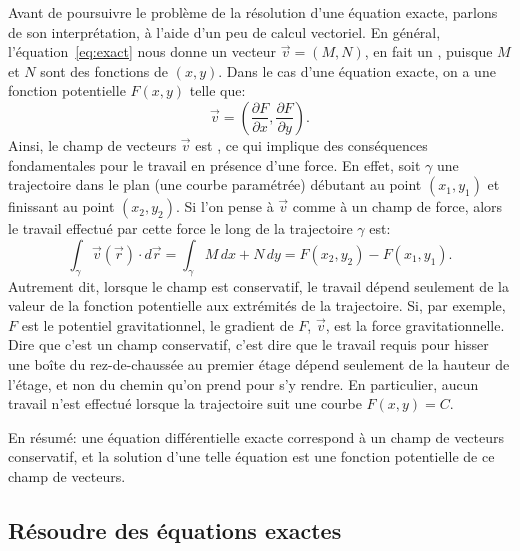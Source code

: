 Avant de poursuivre le problème de la résolution d'une équation exacte, parlons de son interprétation, à l'aide d'un peu de calcul vectoriel.
En général, l'équation~\eqref{eq:exact} nous donne un vecteur $\vec{v} = (M,N)$, en fait un \emph{},
puisque $M$ et $N$ sont des fonctions de $(x,y)$.
Dans le cas d'une équation exacte, on a une fonction potentielle $F(x,y)$ telle que:
\begin{equation*}
	\vec{v} = \left( \frac{\partial F}{\partial x} ,\frac{\partial F}{\partial y} \right) .
\end{equation*}
Ainsi, le champ de vecteurs $\vec{v}$ est \emph{},
ce qui implique des conséquences fondamentales pour le travail en présence d'une force.
En effet, soit $\gamma$ une trajectoire dans le plan (une courbe paramétrée) débutant au point $(x_1,y_1)$
et finissant au point $(x_2,y_2)$.
Si l'on pense à $\vec{v}$ comme à un champ de force, alors le travail effectué par cette force
le long de la trajectoire $\gamma$ est:
\begin{equation*}
	\int_\gamma \vec{v}(\vec{r}) \cdot d\vec{r}
	= \int_\gamma M \, dx + N \, dy
	= F(x_2,y_2) - F(x_1,y_1) .
\end{equation*}
Autrement dit, lorsque le champ est conservatif, le travail dépend seulement de la valeur de la fonction potentielle aux extrémités de la trajectoire.
Si, par exemple, $F$ est le potentiel gravitationnel, le gradient de $F$, $\vec{v}$, est la force gravitationnelle.
Dire que c'est un champ conservatif, c'est dire que le travail requis pour hisser une boîte du rez-de-chaussée au premier étage
dépend seulement de la hauteur de l'étage, et non du chemin qu'on prend pour s'y rendre.
En particulier, aucun travail n'est effectué lorsque la trajectoire suit une courbe $F(x,y) = C$.

En résumé: une équation différentielle exacte correspond à un champ de vecteurs conservatif,
et la solution d'une telle équation est une fonction potentielle de ce champ de vecteurs.


\subsection{Résoudre des équations exactes}

